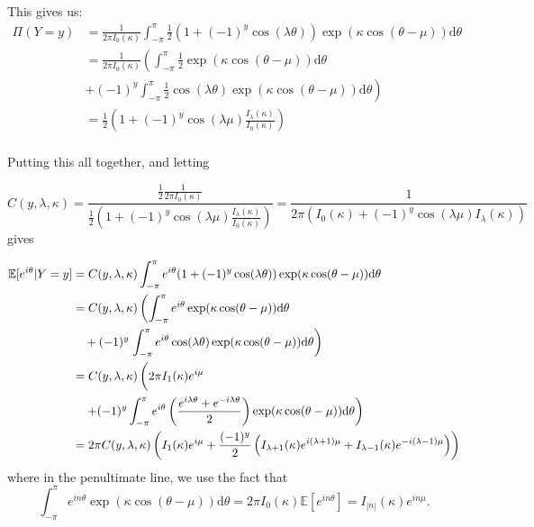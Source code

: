 \documentclass[]{report}
\begin{document}
This gives us:
\begin{align*}
	\Pi(Y = y) &= \frac{1}{2 \pi I_0(\kappa)} \int_{- \pi}^{\pi} \frac{1}{2} (1 + (-1)^y \cos(\lambda \theta)) \exp(\kappa \cos(\theta - \mu)) \text{d} \theta \\
	&= \frac{1}{2 \pi I_0(\kappa)} \left( \int_{- \pi}^{\pi} \frac{1}{2} \exp(\kappa \cos(\theta - \mu)) \text{d} \theta \right. \\
	 &\left. + (-1)^y \int_{- \pi}^{\pi} \frac{1}{2} \cos(\lambda \theta) \exp(\kappa \cos(\theta - \mu)) \text{d} \theta  \right) \\
	&= \frac{1}{2}\left(1 + (-1)^y \cos(\lambda \mu) \frac{I_\lambda(\kappa)}{I_0(\kappa)}\right)  \\
\end{align*}

Putting this all together, and letting

\[
C(y, \lambda, \kappa) = \frac{\frac{1}{2} \frac{1}{2 \pi I_0(\kappa)}}{\frac{1}{2} (1 + (-1)^y \cos(\lambda \mu) \frac{I_\lambda(\kappa)}{I_0(\kappa)} )} = \frac{1}{ 2 \pi(I_0(\kappa) + (-1)^y \cos(\lambda \mu) I_\lambda(\kappa))}
\]
gives

\begin{align*}
	\mathbb{E}[e^{i \theta} | Y = y] &= C(y, \lambda, \kappa) \int_{- \pi}^{\pi} e^{i \theta} (1 + (-1)^y \cos(\lambda \theta)) \exp(\kappa \cos(\theta - \mu)) \text{d} \theta \\
& =	C(y, \lambda, \kappa) \left(  \int_{- \pi}^{\pi} e^{i \theta} \exp(\kappa \cos(\theta - \mu)) \text{d} \theta \right. \\
 & \quad + (-1)^y  \left. \int_{- \pi}^{\pi} e^{i \theta} \cos(\lambda \theta)   \exp(\kappa \cos(\theta - \mu)) \text{d} \theta \right)\\
 &= C(y, \lambda, \kappa) \left( \vphantom{\int_{-\pi}^\pi} 2 \pi I_1(\kappa) e^{i \mu} \right. \\
 &\quad \left.+ (-1)^y  \int_{-\pi}^{\pi} e^{i \theta} \left( \frac{e^{i \lambda \theta} + e^{- i \lambda \theta}}{2}\right)  \exp(\kappa \cos(\theta - \mu)) \text{d} \theta \right) \\
 &= 2 \pi C(y, \lambda, \kappa) \left( I_1(\kappa) e^{i \mu} + \frac{(-1)^y}{2} \left(I_{\lambda + 1}(\kappa)e^{i(\lambda + 1) \mu}  + I_{\lambda - 1}(\kappa) e^{-i(\lambda - 1)\mu}\right) \right)
\end{align*}
where in the penultimate line, we use the fact that
\[
\int_{- \pi}^ \pi e^{i n \theta} \exp(\kappa \cos(\theta - \mu)) \text{d} \theta = 2 \pi I_0(\kappa) \mathbb{E}[e^{i n \theta}] = I_{|n|}(\kappa) e^{i n \mu}.
\]
\end{document}
